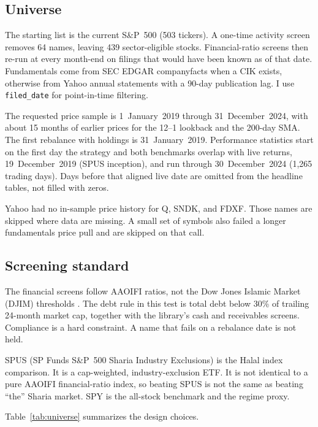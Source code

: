 \documentclass[11pt,letterpaper]{article}
\begin{document}
\subsection{Universe}

The starting list is the current S\&P~500 (503 tickers). A one-time activity screen removes 64 names, leaving 439 sector-eligible stocks. Financial-ratio screens then re-run at every month-end on filings that would have been known as of that date. Fundamentals come from SEC EDGAR companyfacts when a CIK exists, otherwise from Yahoo annual statements with a 90-day publication lag. I use \texttt{filed\_date} for point-in-time filtering.

The requested price sample is 1~January~2019 through 31~December~2024, with about 15 months of earlier prices for the 12--1 lookback and the 200-day SMA. The first rebalance with holdings is 31~January~2019. Performance statistics start on the first day the strategy and both benchmarks overlap with live returns, 19~December~2019 (SPUS inception), and run through 30~December~2024 (1{,}265 trading days). Days before that aligned live date are omitted from the headline tables, not filled with zeros.

Yahoo had no in-sample price history for Q, SNDK, and FDXF. Those names are skipped where data are missing. A small set of symbols also failed a longer fundamentals price pull and are skipped on that call.

\subsection{Screening standard}

The financial screens follow AAOIFI ratios, not the Dow Jones Islamic Market (DJIM) thresholds \citep{aaoifi21,derigs2008}. The debt rule in this test is total debt below 30\% of trailing 24-month market cap, together with the library's cash and receivables screens. Compliance is a hard constraint. A name that fails on a rebalance date is not held.

SPUS (SP Funds S\&P~500 Sharia Industry Exclusions) is the Halal index comparison. It is a cap-weighted, industry-exclusion ETF. It is not identical to a pure AAOIFI financial-ratio index, so beating SPUS is not the same as beating ``the'' Sharia market. SPY is the all-stock benchmark and the regime proxy.

Table~\ref{tab:universe} summarizes the design choices.
\end{document}
